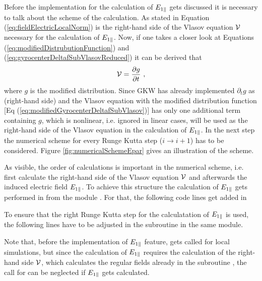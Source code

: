 Before the implementation for the calculation of $E_{1\parallel}$ gets discussed it is necessary to talk about the scheme of the calculation. As stated in Equation (\ref{eq:fieldElectricLocalNorm}) is the right-hand side of the Vlasov equation $\mathcal{V}$ necessary for the calculation of $E_{1\parallel}$. Now, if one takes a closer look at Equations (\ref{eq:modifiedDistrubutionFunction}) and (\ref{eq:gyrocenterDeltafSubVlasovReduced}) it can be derived that
\begin{gather}
    \mathcal{V} = \frac{\partial g}{\partial t}~,
    \label{eq:rightHandSide}
\end{gather}
where $g$ is the modified distribution. Since GKW has already implemented $\partial_t g$ as  (right-hand side) and the Vlasov equation with the modified distribution function [Eq (\ref{eq:modifiedGyrocenterDeltafSubVlasov})] has only one additional term containing $g$, which is nonlinear, i.e. ignored in linear cases,  will be used as the right-hand side of the Vlasov equation in the calculation of $E_{1\parallel}$. In the next step the numerical scheme for every Runge Kutta step ($i \rightarrow i+1$) has to be considered. Figure \ref{fig:numericalSchemeEpar} gives an illustration of the scheme.


As visible, the order of calculations is important in the numerical scheme, i.e. first calculate the right-hand side of the Vlasov equation $\mathcal{V}$ and afterwards the induced electric field $E_{1\parallel}$. To achieve this structure the calculation of $E_{1\parallel}$ gets performed in  from the module . For that, the following code lines get added in 



To ensure that the right Runge Kutta step for the calculatation of $E_{1\parallel}$ is used, the following lines have to be adjusted in the subroutine  in the same module.



Note that, before the implementation of $E_{1\parallel}$ feature,  gets called for local simulations, but since the calculation of $E_{1\parallel}$ requires the calculation of the right-hand side $\mathcal{V}$, which calculates the regular fields already in the subroutine , the call for  can be neglected if $E_{1\parallel}$ gets calculated.

